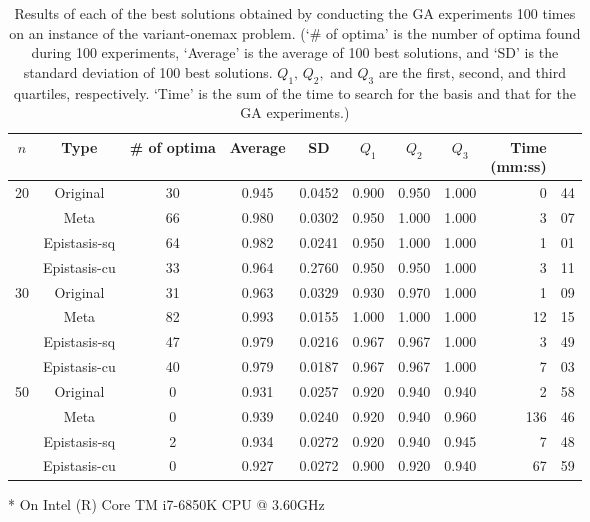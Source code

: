 \begin{table}[H]
	\centering
	\caption{Results of each of the best solutions obtained by conducting the GA experiments 100 times on an instance of the variant-onemax problem. (`\# of optima' is the number of optima found during 100 experiments, `Average' is the average of 100 best solutions, and `SD' is the standard deviation of 100 best solutions. $ Q_1, \, Q_2, $ and $ Q_3 $ are the first, second, and third quartiles, respectively. `Time' is the sum of the time to search for the basis and that for the GA experiments.)} \label{tab:result_var}
	\vspace*{0.2cm}
	\begin{threeparttable}
	\begin{tabular}{ccccccccr@{:}l}
	\toprule
	$ n $ & Type & \# of optima & Average & SD & $ Q_1 $ & $ Q_2 $ & $ Q_3 $ &  \multithead{2}{Time \\ (mm:ss)\tnote{*}} \\
	\midrule
	\multirow{4}{*}{20} & Original		& 30 & 0.945 & 0.0452 & 0.900 & 0.950 & 1.000 & 0 & 44 \\
		                & Meta			& 66 & 0.980 & 0.0302 & 0.950 & 1.000 & 1.000 & 3 & 07 \\
		                & Epistasis-sq	& 64 & 0.982 & 0.0241 & 0.950 & 1.000 & 1.000 & 1 & 01 \\
		                & Epistasis-cu	& 33 & 0.964 & 0.2760 & 0.950 & 0.950 & 1.000 & 3 & 11 \\
	\midrule
	\multirow{4}{*}{30} & Original		& 31 & 0.963 & 0.0329 & 0.930 & 0.970 & 1.000 & 1 & 09  \\
               			& Meta			& 82 & 0.993 & 0.0155 & 1.000 & 1.000 & 1.000 & 12 & 15 \\
						& Epistasis-sq	& 47 & 0.979 & 0.0216 & 0.967 & 0.967 & 1.000 & 3 & 49  \\
						& Epistasis-cu	& 40 & 0.979 & 0.0187 & 0.967 & 0.967 & 1.000 & 7 & 03  \\
	\midrule
	\multirow{4}{*}{50} & Original		& 0  & 0.931 & 0.0257 & 0.920 & 0.940 & 0.940 & 2 & 58   \\
						& Meta			& 0  & 0.939 & 0.0240 & 0.920 & 0.940 & 0.960 & 136 & 46 \\
						& Epistasis-sq	& 2	 & 0.934 & 0.0272 & 0.920 & 0.940 & 0.945 & 7 & 48   \\
						& Epistasis-cu	& 0	 & 0.927 & 0.0272 & 0.900 & 0.920 & 0.940 & 67 & 59  \\	
	\bottomrule
	\end{tabular}
	\begin{tablenotes}
		\footnotesize
		\item[*] On Intel (R) Core TM i7-6850K CPU @ 3.60GHz
	\end{tablenotes}
	\end{threeparttable}
\end{table}

